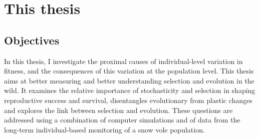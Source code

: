\section{This thesis}
\subsection{Objectives}
In this thesis, I investigate the proximal causes of individual-level variation in fitness, and the consequences of this variation at the population level. This thesis aims at better measuring and better understanding selection and evolution in the wild. It examines the relative importance of stochasticity and selection in shaping reproductive success and survival, disentangles evolutionary from plastic changes and explores the link between selection and evolution. These questions are addressed using a combination of computer simulations and of data from the long-term individual-based monitoring of a snow vole population.

